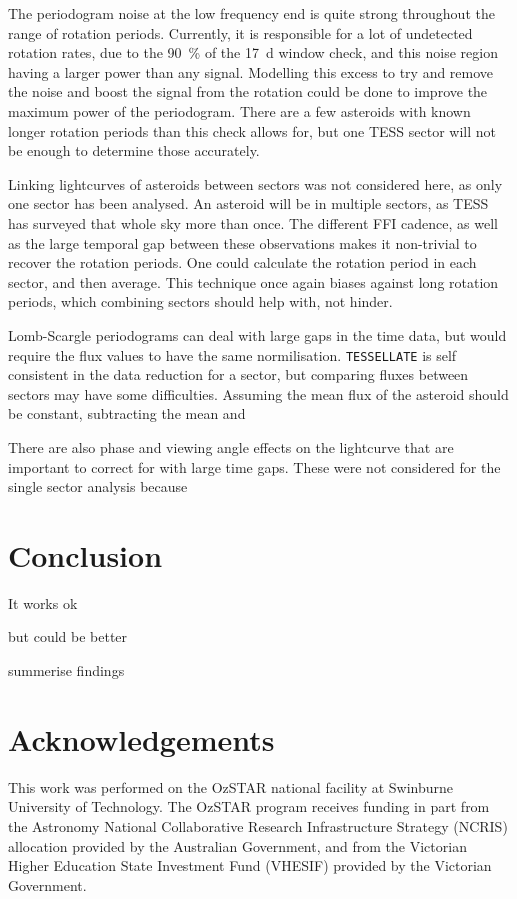 \documentclass{UCreport}
\begin{document}
The periodogram noise at the low frequency end is quite strong throughout the range of rotation periods.
Currently, it is responsible for a lot of undetected rotation rates, due to the \qty{90}{\percent} of the \qty{17}{\day} window check, and this noise region having a larger power than any signal.
Modelling this excess to try and remove the noise and boost the signal from the rotation could be done to improve the maximum power of the periodogram.
There are a few asteroids with known longer rotation periods than this check allows for, but one TESS sector will not be enough to determine those accurately.

Linking lightcurves of asteroids between sectors was not considered here, as only one sector has been analysed.
An asteroid will be in multiple sectors, as TESS has surveyed that whole sky more than once.
The different FFI cadence, as well as the large temporal gap between these observations makes it non-trivial to recover the rotation periods.
One could calculate the rotation period in each sector, and then average.
This technique once again biases against long rotation periods, which combining sectors should help with, not hinder.

Lomb-Scargle periodograms can deal with large gaps in the time data, but would require the flux values to have the same normilisation.
\texttt{TESSELLATE} is self consistent in the data reduction for a sector, but comparing fluxes between sectors may have some difficulties.
Assuming the mean flux of the asteroid should be constant, subtracting the mean and

There are also phase and viewing angle effects on the lightcurve that are important to correct for with large time gaps.
These were not considered for the single sector analysis because







\section{Conclusion}\label{Sec:Conc}

It works ok

but could be better

summerise findings

\newpage %

\section*{Acknowledgements}
\small
This work was performed on the OzSTAR national facility at Swinburne University of Technology.
The OzSTAR program receives funding in part from the Astronomy National Collaborative Research Infrastructure Strategy (NCRIS) allocation provided by the Australian Government, and from the Victorian Higher Education State Investment Fund (VHESIF) provided by the Victorian Government.
\end{document}
